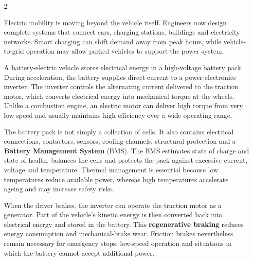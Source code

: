 

\begin{multicols}{2}
\begin{engineeringnews}
Electric mobility is moving beyond the vehicle itself. Engineers now design complete systems that connect cars, charging stations, buildings and electricity networks. Smart charging can shift demand away from peak hours, while vehicle-to-grid operation may allow parked vehicles to support the power system.
\end{engineeringnews}

\begin{ecarticle}
A battery-electric vehicle stores electrical energy in a high-voltage battery pack. During acceleration, the battery supplies direct current to a power-electronics inverter. The inverter controls the alternating current delivered to the traction motor, which converts electrical energy into mechanical torque at the wheels. Unlike a combustion engine, an electric motor can deliver high torque from very low speed and usually maintains high efficiency over a wide operating range.

The battery pack is not simply a collection of cells. It also contains electrical connections, contactors, sensors, cooling channels, structural protection and a \textbf{Battery Management System} (BMS). The BMS estimates state of charge and state of health, balances the cells and protects the pack against excessive current, voltage and temperature. Thermal management is essential because low temperatures reduce available power, whereas high temperatures accelerate ageing and may increase safety risks.

When the driver brakes, the inverter can operate the traction motor as a generator. Part of the vehicle's kinetic energy is then converted back into electrical energy and stored in the battery. This \textbf{regenerative braking} reduces energy consumption and mechanical-brake wear. Friction brakes nevertheless remain necessary for emergency stops, low-speed operation and situations in which the battery cannot accept additional power.


\end{ecarticle}
\end{multicols}
